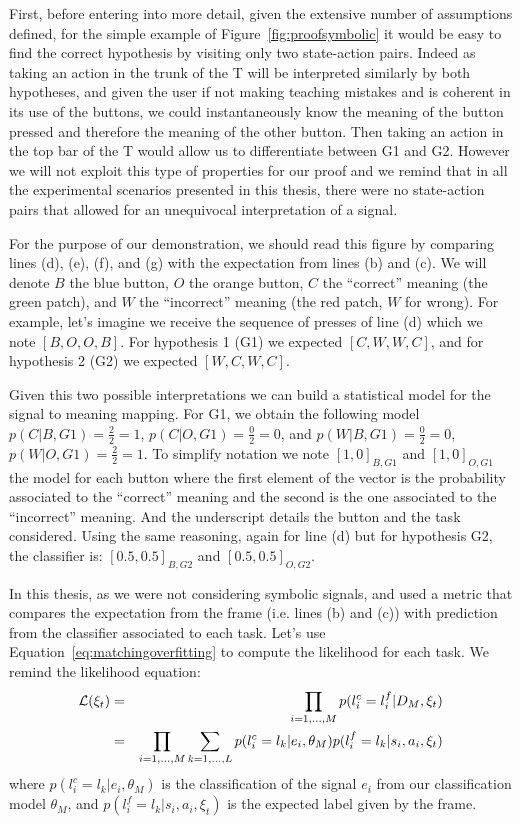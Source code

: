 First, before entering into more detail, given the extensive number of assumptions defined, for the simple example of Figure~\ref{fig:proofsymbolic} it would be easy to find the correct hypothesis by visiting only two state-action pairs. Indeed as taking an action in the trunk of the T will be interpreted similarly by both hypotheses, and given the user if not making teaching mistakes and is coherent in its use of the buttons, we could instantaneously know the meaning of the button pressed and therefore the meaning of the other button. Then taking an action in the top bar of the T would allow us to differentiate between G1 and G2. However we will not exploit this type of properties for our proof and we remind that in all the experimental scenarios presented in this thesis, there were no state-action pairs that allowed for an unequivocal interpretation of a signal.

For the purpose of our demonstration, we should read this figure by comparing lines (d), (e), (f), and (g) with the expectation from lines (b) and (c). We will denote $B$ the blue button, $O$ the orange button, $C$ the ``correct'' meaning (the green patch), and $W$ the ``incorrect'' meaning (the red patch, $W$ for wrong). For example, let's imagine we receive the sequence of presses of line (d) which we note $[B,O,O,B]$. For hypothesis 1 (G1) we expected $[C,W,W,C]$, and for hypothesis 2 (G2) we expected $[W,C,W,C]$. 

Given this two possible interpretations we can build a statistical model for the signal to meaning mapping. For G1, we obtain the following model $p(C|B, G1) = \frac{2}{2} = 1$, $p(C|O, G1) = \frac{0}{2} = 0$, and $p(W|B, G1) = \frac{0}{2} = 0$, $p(W|O, G1) = \frac{2}{2} = 1$. To simplify notation we note $[1,0]_{B,G1}$ and $[1,0]_{O,G1}$ the model for each button where the first element of the vector is the probability associated to the ``correct'' meaning and the second is the one associated to the ``incorrect'' meaning. And the underscript details the button and the task considered. Using the same reasoning, again for line (d) but for hypothesis G2, the classifier is: $[0.5,0.5]_{B,G2}$ and $[0.5,0.5]_{O,G2}$.

In this thesis, as we were not considering symbolic signals, and used a metric that compares the expectation from the frame (i.e. lines (b) and (c)) with prediction from the classifier associated to each task. Let's use Equation~\ref{eq:matchingoverfitting} to compute the likelihood for each task. We remind the likelihood equation:
%
\begin{eqnarray}
\mathcal{L}(\xi_t) &=& \prod_{i = 1,\ldots,M} p(l^c_i = l^f_i | D_M, \xi_t) \nonumber \\ 
&=& \prod_{i = 1,\ldots,M} \sum_{k = 1, \ldots, L} p(l^c_i = l_k | e_i, \theta_M) p(l^f_i = l_k | s_i, a_i, \xi_t) \nonumber
\end{eqnarray}
%
where $p(l^c_i = l_k | e_i, \theta_M)$ is the classification of the signal $e_i$ from our classification model $\theta_M$, and $p(l^f_i = l_k | s_i, a_i, \xi_t)$ is the expected label given by the frame.

